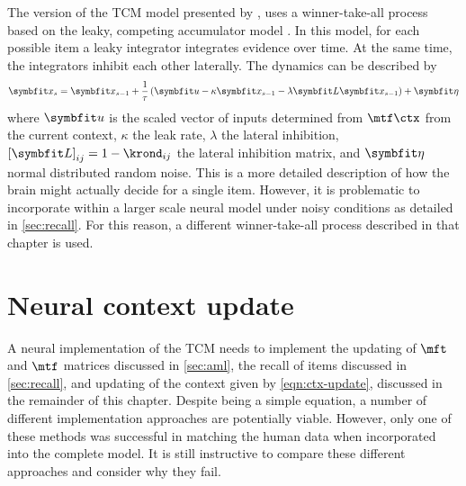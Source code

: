 The version of the TCM model presented by \textcite{Sederberg2008}, uses a winner-take-all process based on the leaky, competing accumulator model \parencite{Usher2001}.
In this model, for each possible item a leaky integrator integrates evidence over time.
At the same time, the integrators inhibit each other laterally.
The dynamics can be described by
\begin{equation}
    \vc x_s = \vc x_{s - 1} + \frac{1}{\tau} \del{\vc u - \kappa \vc x_{s - 1} - \lambda \mat L \vc x_{s - 1}} + \vc\eta
\end{equation}
where $\vc u$ is the scaled vector of inputs determined from $\mtf \ctx$ from the current context, $\kappa$ the leak rate, $\lambda$ the lateral inhibition, ${[\mat L]}_{ij} = 1 - \krond_{ij}$ the lateral inhibition matrix, and $\vc\eta$ normal distributed random noise.
This is a more detailed description of how the brain might actually decide for a single item.
However, it is problematic to incorporate within a larger scale neural model under noisy conditions as detailed in \cref{sec:recall}.
For this reason, a different winner-take-all process described in that chapter is used.


\section{Neural context update}\label{sec:ctx-update}

A neural implementation of the TCM needs to implement the updating of $\mft$ and $\mtf$ matrices discussed in \cref{sec:aml}, the recall of items discussed in \cref{sec:recall}, and updating of the context given by \cref{eqn:ctx-update}, discussed in the remainder of this chapter.
Despite being a simple equation, a number of different implementation approaches are potentially viable.
However, only one of these methods was successful in matching the human data when incorporated into the complete model.
It is still instructive to compare these different approaches and consider why they fail.

